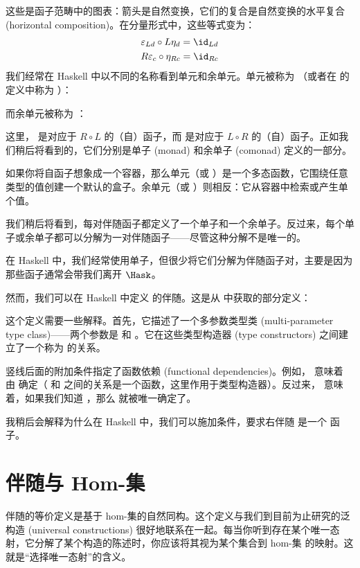 \noindent
这些是函子范畴中的图表：箭头是自然变换，它们的复合是自然变换的水平复合 (horizontal composition)。在分量形式中，这些等式变为：
\begin{gather*}
  \varepsilon_{L d} \circ L \eta_d = \id_{L d} \\
  R \varepsilon_{c} \circ \eta_{R c} = \id_{R c}
\end{gather*}
我们经常在 Haskell 中以不同的名称看到单元和余单元。单元被称为 （或者在  的定义中称为 ）：

而余单元被称为 ：

这里， 是对应于 $R \circ L$ 的（自）函子，而  是对应于 $L \circ R$ 的（自）函子。正如我们稍后将看到的，它们分别是单子 (monad) 和余单子 (comonad) 定义的一部分。

如果你将自函子想象成一个容器，那么单元（或 ）是一个多态函数，它围绕任意类型的值创建一个默认的盒子。余单元（或 ）则相反：它从容器中检索或产生单个值。

我们稍后将看到，每对伴随函子都定义了一个单子和一个余单子。反过来，每个单子或余单子都可以分解为一对伴随函子——尽管这种分解不是唯一的。

在 Haskell 中，我们经常使用单子，但很少将它们分解为伴随函子对，主要是因为那些函子通常会带我们离开 $\Hask$。

然而，我们可以在 Haskell 中定义  的伴随。这是从  中获取的部分定义：

这个定义需要一些解释。首先，它描述了一个多参数类型类 (multi-parameter type class)——两个参数是  和 。它在这些类型构造器 (type constructors) 之间建立了一个称为  的关系。

竖线后面的附加条件指定了函数依赖 (functional dependencies)。例如， 意味着  由  确定（ 和  之间的关系是一个函数，这里作用于类型构造器）。反过来， 意味着，如果我们知道 ，那么  就被唯一确定了。

我稍后会解释为什么在 Haskell 中，我们可以施加条件，要求右伴随  是一个  函子。

\section{伴随与 Hom-集}

伴随的等价定义是基于 hom-集的自然同构。这个定义与我们到目前为止研究的泛构造 (universal constructions) 很好地联系在一起。每当你听到存在某个唯一态射，它分解了某个构造的陈述时，你应该将其视为某个集合到 hom-集 的映射。这就是“选择唯一态射”的含义。

